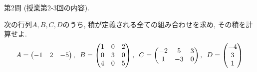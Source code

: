 \documentclass[dvipdfmx,a4paper,11pt]{article}
\theoremstyle{definition}
\begin{document}
 \vspace{22pt}
   
{\Large 第2問} (授業第2-3回の内容).

\vspace{11pt}
次の行列$A,B,C,D$のうち, 積が定義される全ての組み合わせを求め, その積を計算せよ.
 $$
  A=\begin{pmatrix} %
 -1 & 2 &-5  \\
 \end{pmatrix} 
 \text{, \,\,} 
B= \begin{pmatrix} %
 1& 0 & 2\\
 0 & 3 & 0\\
 4 & 0 & 5 \\
 \end{pmatrix} %
 \text{, \,\,} 
 C=
  \begin{pmatrix}
 -2 &5 & 3\\
1 &-3&0  \\
 \end{pmatrix}
 \text{, \,\,} 
 D= \begin{pmatrix} %
 -4\\
 3 \\
 1
 \end{pmatrix}
 $$
 
  \vspace{11pt}
 
\hspace{-11pt}{\Large $\bullet$ 第2問解答例.}
 
\end{document}
